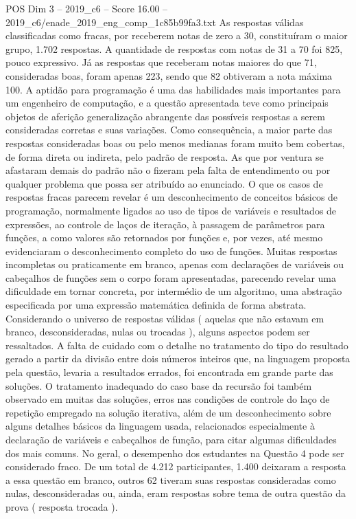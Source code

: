 \begin{textsample}{POS Dim 3 – 2019\_c6 – Score 16.00 – 2019\_c6/enade\_2019\_eng\_comp\_1c85b99fa3.txt}
As respostas válidas classificadas como fracas, por receberem notas de zero a 30, constituíram o maior grupo, 1.702 respostas.
A quantidade de respostas com notas de 31 a 70 foi 825, pouco expressivo.
Já as respostas que receberam notas maiores do que 71, consideradas boas, foram apenas 223, sendo que 82 obtiveram a nota máxima 100.
A aptidão para programação é uma das habilidades mais importantes para um engenheiro de computação, e a questão apresentada teve como principais objetos de aferição generalização abrangente das possíveis respostas a serem consideradas corretas e suas variações.
Como consequência, a maior parte das respostas consideradas boas ou pelo menos medianas foram muito bem cobertas, de forma direta ou indireta, pelo padrão de resposta.
As que por ventura se afastaram demais do padrão não o fizeram pela falta de entendimento ou por qualquer problema que possa ser atribuído ao enunciado.
O que os casos de respostas fracas parecem revelar é um desconhecimento de conceitos básicos de programação, normalmente ligados ao uso de tipos de variáveis e resultados de expressões, ao controle de laços de iteração, à passagem de parâmetros para funções, a como valores são retornados por funções e, por vezes, até mesmo evidenciaram o desconhecimento completo do uso de funções.
Muitas respostas incompletas ou praticamente em branco, apenas com declarações de variáveis ou cabeçalhos de funções sem o corpo foram apresentadas, parecendo revelar uma dificuldade em tornar concreta, por intermédio de um algoritmo, uma abstração especificada por uma expressão matemática definida de forma abstrata.
Considerando o universo de respostas válidas ( aquelas que não estavam em branco, desconsideradas, nulas ou trocadas ), alguns aspectos podem ser ressaltados.
A falta de cuidado com o detalhe no tratamento do tipo do resultado gerado a partir da divisão entre dois números inteiros que, na linguagem proposta pela questão, levaria a resultados errados, foi encontrada em grande parte das soluções.
O tratamento inadequado do caso base da recursão foi também observado em muitas das soluções, erros nas condições de controle do laço de repetição empregado na solução iterativa, além de um desconhecimento sobre alguns detalhes básicos da linguagem usada, relacionados especialmente à declaração de variáveis e cabeçalhos de função, para citar algumas dificuldades dos mais comuns.
No geral, o desempenho dos estudantes na Questão 4 pode ser considerado fraco.
De um total de 4.212 participantes, 1.400 deixaram a resposta a essa questão em branco, outros 62 tiveram suas respostas consideradas como nulas, desconsideradas ou, ainda, eram respostas sobre tema de outra questão da prova ( resposta trocada ).

\end{textsample}
